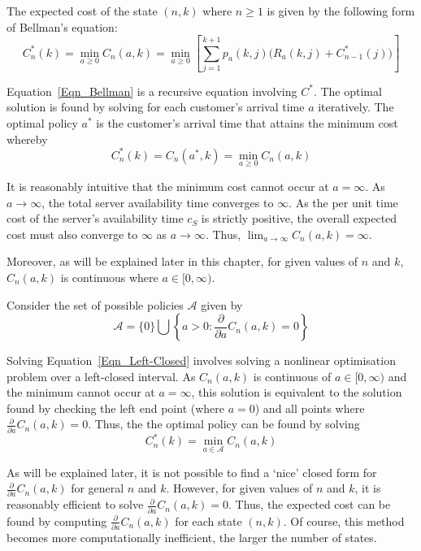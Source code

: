 The expected cost of the state $(n, k)$ where $n \geq 1$ is given by the following form of Bellman's equation:
\begin{equation}
	C_{n}^{*} (k) = \min_{a \geq 0} C_{n} (a, k) = \min_{a \geq 0} \left[ \sum_{j = 1}^{k + 1} p_{a} (k, j) \Big( R_{a} (k, j) + C_{n - 1}^{*} (j) \Big) \right]
	\label{Eqn_Bellman}
\end{equation}

Equation~\ref{Eqn_Bellman} is a recursive equation involving $C^{*}$. The optimal solution is found by solving for each customer's arrival time $a$ iteratively. The optimal policy $a^{*}$ is the customer's arrival time that attains the minimum cost whereby
\begin{equation}
	C_{n}^{*} (k) = C_{n} (a^{*}, k) = \min_{a \geq 0} C_{n} (a, k)
	\label{Eqn_Left-Closed}
\end{equation}

It is reasonably intuitive that the minimum cost cannot occur at $a = \infty$. As $a \to \infty$, the total server availability time converges to $\infty$. As the per unit time cost of the server's availability time $c_{S}$ is strictly positive, the overall expected cost must also converge to $\infty$ as $a \to \infty$. Thus, $\displaystyle \lim_{a \to \infty} C_{n} (a, k) = \infty$.

Moreover, as will be explained later in this chapter, for given values of $n$ and $k$, $C_{n} (a, k)$ is continuous where $a \in [0, \infty)$. 

Consider the set of possible policies $\mathcal{A}$ given by
\begin{equation}
	\mathcal{A} = \{ 0 \} \bigcup \left\{ a > 0 : \frac{\partial}{\partial a} C_{n} (a, k) = 0 \right\}
\end{equation}

Solving Equation~\ref{Eqn_Left-Closed} involves solving a nonlinear optimisation problem over a left-closed interval. As $C_{n} (a, k)$ is continuous of $a \in [0, \infty)$ and the minimum cannot occur at $a = \infty$, this solution is equivalent to the solution found by checking the left end point (where $a = 0$) and all points where $\frac{\partial}{\partial a} C_{n} (a, k) = 0$. Thus, the the optimal policy can be found by solving
\begin{equation}
	C_{n}^{*} (k) = \min_{a \in \mathcal{A}} C_{n} (a, k)
\end{equation}

As will be explained later, it is not possible to find a `nice' closed form for $\frac{\partial}{\partial a} C_{n} (a, k)$ for general $n$ and $k$. However, for given values of $n$ and $k$, it is reasonably efficient to solve $\frac{\partial}{\partial a} C_{n} (a, k) = 0$. Thus, the expected cost can be found by computing $\frac{\partial}{\partial a} C_{n} (a, k)$ for each state $(n, k)$. Of course, this method becomes more computationally inefficient, the larger the number of states.

